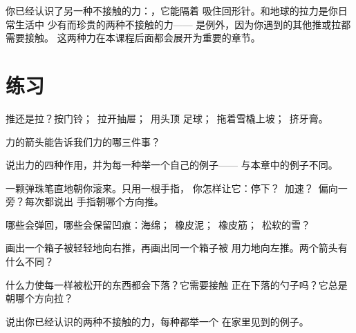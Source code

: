 \begin{remark}[老朋友]\label{rem:g2:pushes-and-pulls:magnets}
你已经认识了另一种不接触的力：，它能隔着
吸住回形针。和地球的拉力是你日常生活中
少有而珍贵的两种不接触的力——
是例外，因为你遇到的其他推或拉都需要接触。
这两种力在本课程后面都会展开为重要的章节。
\end{remark}

\section{练习}

\begin{exercise}[$\star$]\label{exo:g2:pushes-and-pulls:1}
推还是拉？按门铃；\ 拉开抽屉；\ 用头顶
足球；\ 拖着雪橇上坡；\ 挤牙膏。
\end{exercise}

\begin{exercise}[$\star$]\label{exo:g2:pushes-and-pulls:2}
力的箭头能告诉我们力的哪三件事？
\end{exercise}

\begin{exercise}[$\star$]\label{exo:g2:pushes-and-pulls:3}
说出力的四种作用，并为每一种举一个自己的例子——
与本章中的例子不同。
\end{exercise}

\begin{exercise}[$\star$]\label{exo:g2:pushes-and-pulls:4}
一颗弹珠笔直地朝你滚来。只用一根手指，
你怎样让它：停下？\ 加速？\ 偏向一旁？每次都说出
手指朝哪个方向推。
\end{exercise}

\begin{exercise}[$\star$]\label{exo:g2:pushes-and-pulls:5}
哪些会弹回，哪些会保留凹痕：海绵；\
橡皮泥；\ 橡皮筋；\ 松软的雪？
\end{exercise}

\begin{exercise}[$\star$]\label{exo:g2:pushes-and-pulls:6}
画出一个箱子被轻轻地向右推，再画出同一个箱子被
用力地向左推。两个箭头有什么不同？
\end{exercise}

\begin{exercise}[$\star$]\label{exo:g2:pushes-and-pulls:7}
什么力使每一样被松开的东西都会下落？它需要接触
正在下落的勺子吗？它总是朝哪个方向拉？
\end{exercise}

\begin{exercise}[$\star$]\label{exo:g2:pushes-and-pulls:8}
说出你已经认识的两种不接触的力，每种都举一个
在家里见到的例子。
\end{exercise}

